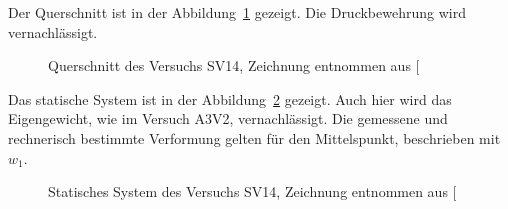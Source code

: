 \documentclass[
  10pt,
  letterpaper,
]{scrreprt}
\begin{document}
Der Querschnitt ist in der Abbildung~\ref{fig-QS-SV14} gezeigt. Die
Druckbewehrung wird vernachlässigt.

\begin{figure}[H]


\caption{\label{fig-QS-SV14}Querschnitt des Versuchs SV14, Zeichnung
entnommen aus {[}\citeproc{ref-gitz_ansatze_2024}{1}{]}}

\end{figure}%

Das statische System ist in der Abbildung~\ref{fig-system-SV14} gezeigt.
Auch hier wird das Eigengewicht, wie im Versuch A3V2, vernachlässigt.
Die gemessene und rechnerisch bestimmte Verformung gelten für den
Mittelspunkt, beschrieben mit \(w_1\).

\begin{figure}[H]


\caption{\label{fig-system-SV14}Statisches System des Versuchs SV14,
Zeichnung entnommen aus {[}\citeproc{ref-gitz_ansatze_2024}{1}{]}}

\end{figure}%
\end{document}

